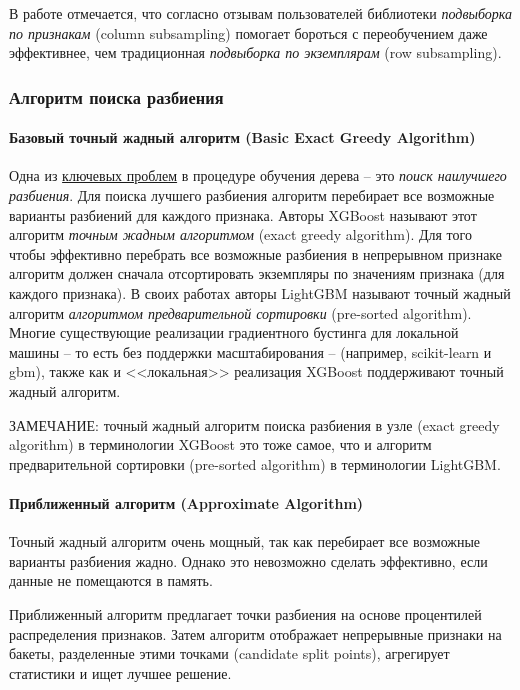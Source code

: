 \documentclass[%
	11pt,
	a4paper,
	utf8,
		]{article}
\begin{document}
В работе отмечается, что согласно отзывам пользователей библиотеки \emph{подвыборка по признакам} (column subsampling) помогает бороться с переобучением даже эффективнее, чем традиционная \emph{подвыборка по экземплярам} (row subsampling).

\subsubsection{Алгоритм поиска разбиения}

\paragraph{Базовый точный жадный алгоритм (Basic Exact Greedy Algorithm)} 

Одна из \underline{ключевых проблем} в процедуре обучения дерева -- это \emph{поиск наилучшего разбиения}. Для поиска лучшего разбиения алгоритм перебирает все возможные варианты разбиений для каждого признака. Авторы XGBoost называют этот алгоритм \emph{точным жадным алгоритмом} (exact greedy algorithm). Для того чтобы эффективно перебрать все возможные разбиения в непрерывном признаке алгоритм должен сначала отсортировать экземпляры по значениям признака (для каждого признака). В своих работах авторы LightGBM называют точный жадный алгоритм \emph{алгоритмом предварительной сортировки} (pre-sorted algorithm). Многие существующие реализации градиентного бустинга для локальной машины -- то есть без поддержки масштабирования -- (например, scikit-learn и gbm), также как и <<локальная>> реализация XGBoost поддерживают точный жадный алгоритм.

ЗАМЕЧАНИЕ: точный жадный алгоритм поиска разбиения в узле (exact greedy algorithm) в терминологии XGBoost это тоже самое, что и алгоритм предварительной сортировки (pre-sorted algorithm) в терминологии LightGBM.

\paragraph{Приближенный алгоритм (Approximate Algorithm)} Точный жадный алгоритм очень мощный, так как перебирает все возможные варианты разбиения жадно. Однако это невозможно сделать эффективно, если данные не помещаются в память.

Приближенный алгоритм предлагает точки разбиения на основе процентилей распределения признаков. Затем алгоритм отображает непрерывные признаки на бакеты, разделенные этими точками (candidate split points), агрегирует статистики и ищет лучшее решение.
\end{document}
